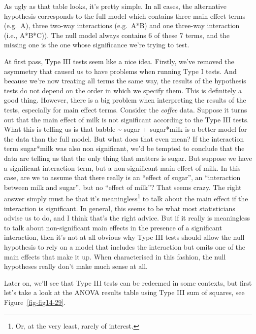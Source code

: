 \documentclass[
  a4paper,
]{book}
\begin{document}
As ugly as that table looks, it's pretty simple. In all cases, the
alternative hypothesis corresponds to the full model which contains
three main effect terms (e.g.~A), three two-way interactions (e.g.~A*B)
and one three-way interaction (i.e., A*B*C)). The null model always
contains 6 of these 7 terms, and the missing one is the one whose
significance we're trying to test.

At first pass, Type III tests seem like a nice idea. Firstly, we've
removed the asymmetry that caused us to have problems when running Type
I tests. And because we're now treating all terms the same way, the
results of the hypothesis tests do not depend on the order in which we
specify them. This is definitely a good thing. However, there is a big
problem when interpreting the results of the tests, especially for main
effect terms. Consider the \emph{coffee} data. Suppose it turns out that
the main effect of milk is not significant according to the Type III
tests. What this is telling us is that babble \textasciitilde{} sugar +
sugar*milk is a better model for the data than the full model. But what
does that even mean? If the interaction term sugar*milk was also non
significant, we'd be tempted to conclude that the data are telling us
that the only thing that matters is sugar. But suppose we have a
significant interaction term, but a non-significant main effect of milk.
In this case, are we to assume that there really is an ``effect of
sugar'', an ``interaction between milk and sugar'', but no ``effect of
milk''? That seems crazy. The right answer simply must be that it's
meaningless\footnote{Or, at the very least, rarely of interest.} to talk
about the main effect if the interaction is significant. In general,
this seems to be what most statisticians advise us to do, and I think
that's the right advice. But if it really is meaningless to talk about
non-significant main effects in the presence of a significant
interaction, then it's not at all obvious why Type III tests should
allow the null hypothesis to rely on a model that includes the
interaction but omits one of the main effects that make it up. When
characterised in this fashion, the null hypotheses really don't make
much sense at all.

Later on, we'll see that Type III tests can be redeemed in some
contexts, but first let's take a look at the ANOVA results table using
Type III sum of squares, see Figure~\ref{fig-fig14-29}.
\end{document}
